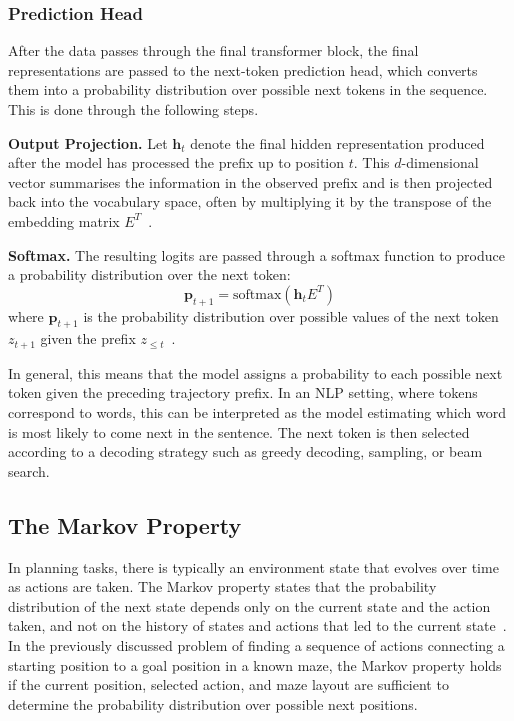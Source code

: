 ﻿\documentclass[12pt,a4paper]{article}
\let\oldcite\cite
\renewcommand{\cite}[1]{\mbox{\oldcite{#1}}}
\theoremstyle{definition}
\begin{document}
\subsubsection{Prediction Head}

After the data passes through the final transformer block, the final representations are passed 
to the next-token prediction head, which converts them into a probability distribution over possible next 
tokens in the sequence. This is done through the following steps.

\textbf{\small Output Projection.} Let $\mathbf{h}_t$ denote the final hidden representation produced after
the model has processed the prefix up to position $t$. This $d$-dimensional vector summarises the
information in the observed prefix and is then projected back into the vocabulary space, often by
multiplying it by the transpose of the embedding matrix $E^T$~\cite{jurafsky2026speech}.

\textbf{\small Softmax.} The resulting logits are passed through a softmax function to produce a 
probability distribution over the next token:
\begin{equation}
\mathbf{p}_{t+1} = \mathrm{softmax}(\mathbf{h}_t E^T)
\end{equation}
where $\mathbf{p}_{t+1}$ is the probability distribution over possible values of the next token
$z_{t+1}$ given the prefix $z_{\le t}$~\cite{jurafsky2026speech}.

In general, this means that the model assigns a probability to each possible next token given the preceding 
trajectory prefix. In an NLP setting, where tokens correspond to words, this can be interpreted as the model 
estimating which word is most likely to come next in the sentence. The next token is then selected according 
to a decoding strategy such as greedy decoding, sampling, or beam search.

\subsection{The Markov Property}

In planning tasks, there is typically an environment state that evolves over time as
actions are taken. The Markov property states that the probability distribution of the
next state depends only on the current state and the action taken, and not on the history
of states and actions that led to the current state~\cite{sutton2018rl}. In the previously
discussed problem of finding a sequence of actions connecting a starting position to a
goal position in a known maze, the Markov property holds if the current position, selected
action, and maze layout are sufficient to determine the probability distribution over
possible next positions.
\end{document}
